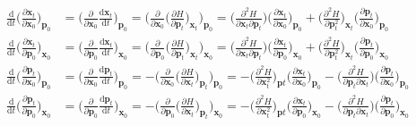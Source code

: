    \begin{equation}
        \begin{split}
            \frac{\mathrm{d}}{\mathrm{d}t} \bigg(\frac {\partial \bm{x}_t}{\partial \bm{x}_0}\bigg)_{\bm{p}_0} &= \bigg(\frac {\partial}{\partial \bm{x}_0} \frac {\mathrm{d}\bm{x}_t}{\mathrm{d}t}\bigg)_{\bm{p}_0} = \bigg(\frac {\partial}{\partial \bm{x}_0} \bigg(\frac {\partial H}{\partial \bm{p}_t}\bigg)_{\bm{x}_t}\bigg)_{\bm{p}_0} = \bigg(\frac {\partial^2 H}{\partial \bm{x}_t \partial \bm{p}_t}\bigg) \bigg(\frac {\partial \bm{x}_t}{\partial \bm{x}_0}\bigg)_{\bm{p}_0}+ \bigg(\frac {\partial^2H}{\partial \bm{p}_t^2}\bigg)_{\bm{x}_t} \bigg(\frac {\partial \bm{p}_t}{\partial \bm{x}_0}\bigg)_{\bm{p}_0}\\
            \frac{\mathrm{d}}{\mathrm{d}t} \bigg(\frac {\partial \bm{x}_t}{\partial \bm{p}_0}\bigg)_{\bm{x}_0} &= \bigg(\frac {\partial}{\partial \bm{p}_0} \frac {\mathrm{d}\bm{x}_t}{\mathrm{d}t}\bigg)_{\bm{x}_0} = \bigg(\frac {\partial}{\partial \bm{p}_0} \bigg(\frac {\partial H}{\partial \bm{p}_t}\bigg)_{\bm{x}_t}\bigg)_{\bm{x}_0} = \bigg(\frac {\partial^2 H}{\partial \bm{x}_t \partial \bm{p}_t}\bigg) \bigg(\frac {\partial \bm{x}_t}{\partial \bm{p}_0}\bigg)_{\bm{x}_0} + \bigg(\frac {\partial^2H}{\partial \bm{p}_t^2}\bigg)_{\bm{x}_t} \bigg(\frac {\partial \bm{p}_t}{\partial \bm{p}_0}\bigg)_{\bm{x}_0}\\
            \frac{\mathrm{d}}{\mathrm{d}t} \bigg(\frac {\partial \bm{p}_t}{\partial \bm{x}_0}\bigg)_{\bm{p}_0} &= \bigg(\frac {\partial}{\partial \bm{x}_0} \frac {\mathrm{d}\bm{p}_t}{\mathrm{d}t}\bigg)_{\bm{p}_0} = -\bigg(\frac {\partial}{\partial \bm{x}_0} \bigg(\frac {\partial H}{\partial \bm{x}_t}\bigg)_{\bm{p}_t}\bigg)_{\bm{p}_0} = -\bigg(\frac {\partial^2 H}{\partial \bm{x}_t^2}\bigg)_{\bm{p}t} \bigg(\frac {\partial \bm{x}_t}{\partial \bm{x}_0}\bigg)_{\bm{p}_0}- \bigg(\frac {\partial^2H}{\partial \bm{p}_t \partial \bm{x}_t}\bigg) \bigg(\frac {\partial \bm{p}_t}{\partial \bm{x}_0}\bigg)_{\bm{p}_0}\\
            \frac{\mathrm{d}}{\mathrm{d}t} \bigg(\frac {\partial \bm{p}_t}{\partial \bm{p}_0}\bigg)_{\bm{x}_0} &= \bigg(\frac {\partial}{\partial \bm{p}_0} \frac {\mathrm{d}\bm{p}_t}{\mathrm{d}t}\bigg)_{\bm{x}_0} = -\bigg(\frac {\partial}{\partial \bm{p}_0} \bigg(\frac {\partial H}{\partial \bm{x}_t}\bigg)_{\bm{p}_t}\bigg)_{\bm{x}_0} = -\bigg(\frac {\partial^2 H}{\partial \bm{x}_t^2}\bigg)_{\bm{p}t} \bigg(\frac {\partial \bm{x}_t}{\partial \bm{p}_0}\bigg)_{\bm{x}_0}- \bigg(\frac {\partial^2H}{\partial \bm{p}_t \partial \bm{x}_t}\bigg) \bigg(\frac {\partial \bm{p}_t}{\partial \bm{p}_0}\bigg)_{\bm{x}_0}    
        \end{split}
    \end{equation}

